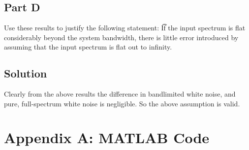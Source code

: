 \documentclass{article}
\begin{document}
\subsection*{Part D}
Use these results to justify the following statement:
\t If the input spectrum is flat considerably beyond the system bandwidth, there is little error introduced by assuming that the input spectrum is flat out to infinity.
\subsection*{Solution}
Clearly from the above results the difference in bandlimited white noise, and pure, full-spectrum white noise is negligible.  So the above assumption is valid.

\section*{Appendix A: MATLAB Code}


\end{document}
